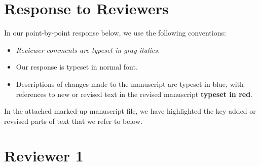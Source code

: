 \documentclass{article}
\newcommand{\revr}[1]{{\color{gray} \itshape #1}}
\newcommand{\auth}[1]{{#1}}
\newcommand{\chng}[1]{{\color{blue!70!black} #1}}
\begin{document}
\section*{Response to Reviewers}

In our point-by-point response below, we use the following conventions:

\begin{itemize}
\item \revr{Reviewer comments are typeset in gray italics.}
\item \auth{Our response is typeset in normal font.}
\item \chng{Descriptions of changes made to the manuscript are typeset in blue, with references to new or 
revised text in the revised manuscript {\bfseries\color{red!70!black} typeset in red}.}
\end{itemize}

In the attached marked-up manuscript file, we have highlighted the key added or revsised parts of text that we refer to below. 

\section*{Reviewer 1}
\end{document}
